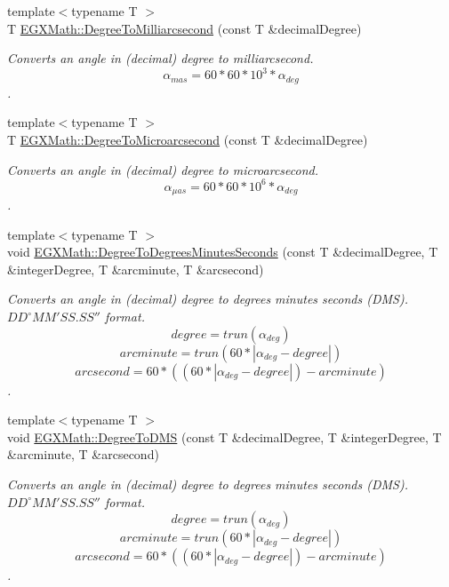 \begin{DoxyCompactItemize}
{\footnotesize template$<$typename T $>$ }\\T \mbox{\hyperlink{group___e_g_x_math-_angle_conversions-_degree_ga2c218e286b2ef72a00734dbc5a7f5ab6}{E\+G\+X\+Math\+::\+Degree\+To\+Milliarcsecond}} (const T \&decimal\+Degree)
\begin{DoxyCompactList}\small\item\em Converts an angle in (decimal) degree to milliarcsecond. \[\alpha_{mas}=60 * 60 * 10^3 * \alpha_{deg} \]. \end{DoxyCompactList}\item 
{\footnotesize template$<$typename T $>$ }\\T \mbox{\hyperlink{group___e_g_x_math-_angle_conversions-_degree_ga31b65388fe1b4656663b3d66b9d764e6}{E\+G\+X\+Math\+::\+Degree\+To\+Microarcsecond}} (const T \&decimal\+Degree)
\begin{DoxyCompactList}\small\item\em Converts an angle in (decimal) degree to microarcsecond. \[\alpha_{\mu as}=60 * 60 * 10^6 * \alpha_{deg}\]. \end{DoxyCompactList}\item 
{\footnotesize template$<$typename T $>$ }\\void \mbox{\hyperlink{group___e_g_x_math-_angle_conversions-_degree_ga859585939255d52d010c780c68eb6e23}{E\+G\+X\+Math\+::\+Degree\+To\+Degrees\+Minutes\+Seconds}} (const T \&decimal\+Degree, T \&integer\+Degree, T \&arcminute, T \&arcsecond)
\begin{DoxyCompactList}\small\item\em Converts an angle in (decimal) degree to degrees minutes seconds (D\+MS). ${DD}^{\circ}{MM}'{SS.SS}''$ format. \[degree=trun(\alpha_{deg})\] \[arcminute=trun(60 * |\alpha_{deg} - degree|)\] \[arcsecond=60 * ((60 * |\alpha_{deg} - degree|)-arcminute)\]. \end{DoxyCompactList}\item 
{\footnotesize template$<$typename T $>$ }\\void \mbox{\hyperlink{group___e_g_x_math-_angle_conversions-_degree_ga1096d04647918e20f61fb184ba2a7dce}{E\+G\+X\+Math\+::\+Degree\+To\+D\+MS}} (const T \&decimal\+Degree, T \&integer\+Degree, T \&arcminute, T \&arcsecond)
\begin{DoxyCompactList}\small\item\em Converts an angle in (decimal) degree to degrees minutes seconds (D\+MS). ${DD}^{\circ}{MM}'{SS.SS}''$ format. \[degree=trun(\alpha_{deg})\] \[arcminute=trun(60 * |\alpha_{deg} - degree|)\] \[arcsecond=60 * ((60 * |\alpha_{deg} - degree|)-arcminute)\]. \end{DoxyCompactList}\item 

\end{DoxyCompactItemize}
